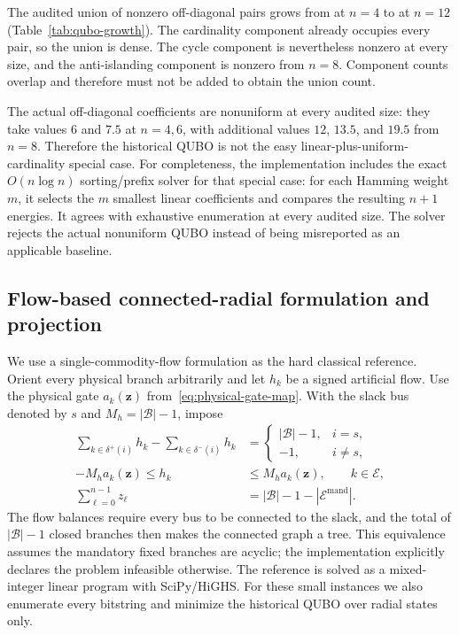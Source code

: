 \documentclass[5p,twocolumn,number,sort&compress,nopreprintline]{elsarticle}
\begin{document}
The audited union of nonzero off-diagonal pairs grows from
\MinQuboCouplings{} at $n=4$ to \MaxQuboCouplings{} at $n=12$
(Table~\ref{tab:qubo-growth}). The cardinality component already
occupies every pair, so the union is dense. The cycle component is
nevertheless nonzero at every size, and the anti-islanding component
is nonzero from $n=8$. Component counts overlap and therefore must not
be added to obtain the union count.



The actual off-diagonal coefficients are nonuniform at every audited
size: they take values $6$ and $7.5$ at $n=4,6$, with additional
values $12$, $13.5$, and $19.5$ from $n=8$. Therefore the historical
QUBO is not the easy linear-plus-uniform-cardinality special case.
For completeness, the implementation includes the exact
$O(n\log n)$ sorting/prefix solver for that special case: for each
Hamming weight $m$, it selects the $m$ smallest linear coefficients
and compares the resulting $n+1$ energies. It agrees with exhaustive
enumeration at every audited size. The solver rejects the actual
nonuniform QUBO instead of being misreported as an applicable baseline.

\subsection{Flow-based connected-radial formulation and projection}
\label{sec:exact-radiality}
We use a single-commodity-flow formulation as the hard classical
reference. Orient every physical branch arbitrarily and let $h_k$ be
a signed artificial flow. Use the physical gate
$a_k(\boldsymbol z)$ from~\eqref{eq:physical-gate-map}. With the slack
bus denoted by $s$ and $M_h=|\mathcal B|-1$, impose
\begin{subequations}\label{eq:exact-radiality}
\begin{align}
\sum_{k\in\delta^+(i)}h_k-\sum_{k\in\delta^-(i)}h_k
&=\begin{cases}|\mathcal B|-1,&i=s,\\-1,&i\ne s,
\end{cases}\label{eq:tree-flow}\\
-M_h a_k(\boldsymbol z)\le h_k&\le M_h a_k(\boldsymbol z),
\qquad k\in\mathcal E,
\label{eq:tree-gate}\\
\sum_{\ell=0}^{n-1}z_\ell
&=|\mathcal B|-1-|\mathcal E^{\mathrm{mand}}|.
\label{eq:tree-cardinality}
\end{align}
\end{subequations}
The flow balances require every bus to be connected to the slack, and
the total of $|\mathcal B|-1$ closed branches then makes the connected
graph a tree. This equivalence assumes the mandatory fixed branches are
acyclic; the implementation explicitly declares the problem infeasible
otherwise. The reference is solved as a mixed-integer linear program
with SciPy/HiGHS. For these small instances we also enumerate every
bitstring and minimize the historical QUBO over radial states only.
\end{document}
